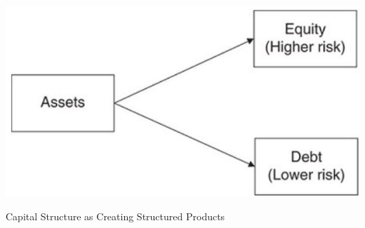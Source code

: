\documentclass[11pt]{article}
\begin{document}
\begin{center}
\includegraphics[max width=\textwidth]{2024_04_09_9bf8a7f77f11effcb65bg-2}
\end{center}

Capital Structure as Creating Structured Products
\end{document}
